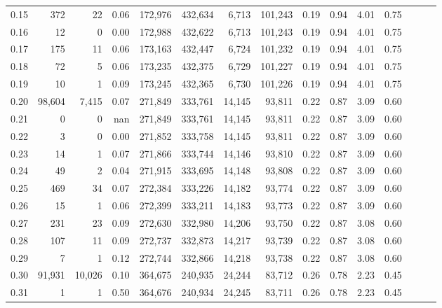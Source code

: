 \begin{tabular}{rrrrrrrrrrrrrrr}
0.15 &     372 &      22 &  0.06 &  172,976 &  432,634 &    6,713 &  101,243 &  0.19 &  0.94 &  4.01 &      0.75 \\
0.16 &      12 &       0 &  0.00 &  172,988 &  432,622 &    6,713 &  101,243 &  0.19 &  0.94 &  4.01 &      0.75 \\
0.17 &     175 &      11 &  0.06 &  173,163 &  432,447 &    6,724 &  101,232 &  0.19 &  0.94 &  4.01 &      0.75 \\
0.18 &      72 &       5 &  0.06 &  173,235 &  432,375 &    6,729 &  101,227 &  0.19 &  0.94 &  4.01 &      0.75 \\
0.19 &      10 &       1 &  0.09 &  173,245 &  432,365 &    6,730 &  101,226 &  0.19 &  0.94 &  4.01 &      0.75 \\
0.20 &  98,604 &   7,415 &  0.07 &  271,849 &  333,761 &   14,145 &   93,811 &  0.22 &  0.87 &  3.09 &      0.60 \\
0.21 &       0 &       0 &   nan &  271,849 &  333,761 &   14,145 &   93,811 &  0.22 &  0.87 &  3.09 &      0.60 \\
0.22 &       3 &       0 &  0.00 &  271,852 &  333,758 &   14,145 &   93,811 &  0.22 &  0.87 &  3.09 &      0.60 \\
0.23 &      14 &       1 &  0.07 &  271,866 &  333,744 &   14,146 &   93,810 &  0.22 &  0.87 &  3.09 &      0.60 \\
0.24 &      49 &       2 &  0.04 &  271,915 &  333,695 &   14,148 &   93,808 &  0.22 &  0.87 &  3.09 &      0.60 \\
0.25 &     469 &      34 &  0.07 &  272,384 &  333,226 &   14,182 &   93,774 &  0.22 &  0.87 &  3.09 &      0.60 \\
0.26 &      15 &       1 &  0.06 &  272,399 &  333,211 &   14,183 &   93,773 &  0.22 &  0.87 &  3.09 &      0.60 \\
0.27 &     231 &      23 &  0.09 &  272,630 &  332,980 &   14,206 &   93,750 &  0.22 &  0.87 &  3.08 &      0.60 \\
0.28 &     107 &      11 &  0.09 &  272,737 &  332,873 &   14,217 &   93,739 &  0.22 &  0.87 &  3.08 &      0.60 \\
0.29 &       7 &       1 &  0.12 &  272,744 &  332,866 &   14,218 &   93,738 &  0.22 &  0.87 &  3.08 &      0.60 \\
0.30 &  91,931 &  10,026 &  0.10 &  364,675 &  240,935 &   24,244 &   83,712 &  0.26 &  0.78 &  2.23 &      0.45 \\
0.31 &       1 &       1 &  0.50 &  364,676 &  240,934 &   24,245 &   83,711 &  0.26 &  0.78 &  2.23 &      0.45 \\

\end{tabular}
